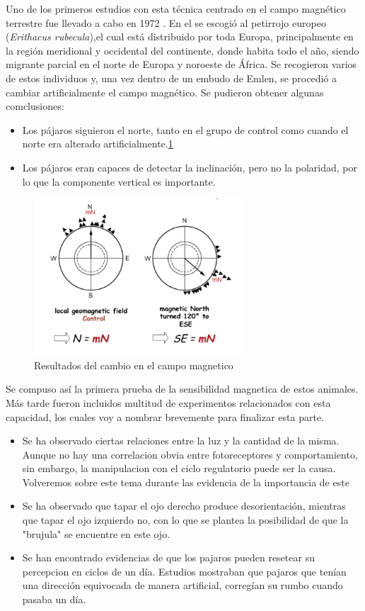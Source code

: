 \documentclass[1p]{elsarticle}
\begin{document}
 Uno de los primeros estudios con esta técnica centrado en el campo magnético terrestre fue llevado a cabo en 1972 \cite{petirrojo}. En el se escogió al petirrojo europeo (\textit{Erithacus rubecula}),el cual está distribuido por toda Europa, principalmente en la región meridional y occidental del continente, donde habita todo el año, siendo migrante parcial en el norte de Europa y noroeste de África.
Se recogieron varios de estos individuos y, una vez dentro de un embudo de Emlen, se procedió a cambiar artificialmente el campo magnético. Se pudieron obtener algunas comclusiones: 
\begin{itemize}
	\item Los pájaros siguieron el norte, tanto en el grupo de control como cuando el norte era alterado artificialmente.\ref{embudo_2}
	\item Los pájaros eran capaces de detectar la inclinación, pero no la polaridad, por lo que la componente vertical es importante.
\end{itemize}
\begin{figure}
	\centering
	\includegraphics[width=0.7\textwidth]{embudopollos}
	\caption{Resultados del cambio en el campo magnetico}
	\label{embudo_2}
\end{figure}

Se compuso así la primera prueba de la sensibilidad magnetica de estos animales. Más tarde fueron incluidos multitud de experimentos relacionados con esta capacidad, los cuales voy a nombrar brevemente para finalizar esta parte.

\begin{itemize}
	\item Se ha observado ciertas relaciones entre la luz y la cantidad de la misma. Aunque no hay una correlacion obvia entre fotoreceptores y comportamiento, sin embargo, la manipulacion con el ciclo regulatorio puede ser la causa. Volveremos sobre este tema durante las evidencia de la importancia de este 
	\item Se ha observado que tapar el ojo derecho produce desorientación, mientras que tapar el ojo izquierdo no, con lo que se plantea la posibilidad de que la "brujula" se encuentre en este ojo.
	\item Se han encontrado evidencias de que los pajaros pueden resetear su percepcion en ciclos de un día. Estudios mostraban que pajaros que tenían una dirección equivocada de manera artificial, corregían su rumbo cuando pasaba un día.
\end{itemize}
\end{document}
